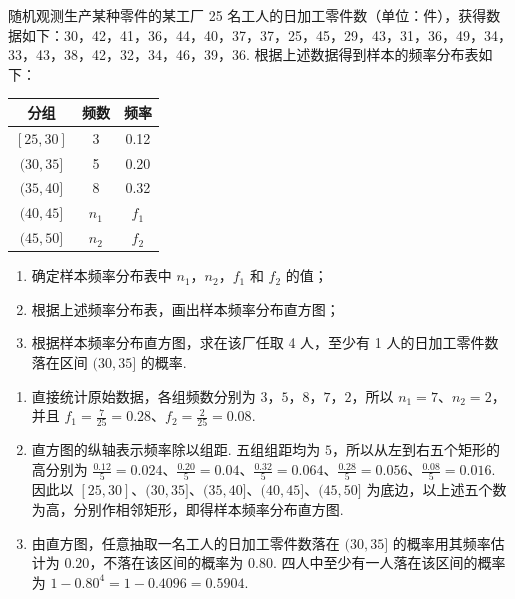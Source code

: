 \begin{problem}
随机观测生产某种零件的某工厂 25 名工人的日加工零件数（单位：件），获得数据如下：30，42，41，36，44，40，37，37，25，45，29，43，31，36，49，34，33，43，38，42，32，34，46，39，36.
根据上述数据得到样本的频率分布表如下：

\begin{center}
\begin{tabular}{c|cc}
\hline
分组 & 频数 & 频率 \\
\hline
\([25,30]\) & 3 & 0.12 \\
\((30,35]\) & 5 & 0.20 \\
\((35,40]\) & 8 & 0.32 \\
\((40,45]\) & \(n_1\) & \(f_1\) \\
\((45,50]\) & \(n_2\) & \(f_2\) \\
\hline
\end{tabular}
\end{center}

\begin{enumerate}
\item 确定样本频率分布表中 \(n_1\)，\(n_2\)，\(f_1\) 和 \(f_2\) 的值；
\item 根据上述频率分布表，画出样本频率分布直方图；
\item 根据样本频率分布直方图，求在该厂任取 4 人，至少有 1 人的日加工零件数落在区间 \((30,35]\) 的概率.
\end{enumerate}
\end{problem}

\begin{solution}
\begin{enumerate}
\item 直接统计原始数据，各组频数分别为 \(3\)，\(5\)，\(8\)，\(7\)，\(2\)，所以
\(n_1=7\)、\(n_2=2\)，并且
\(f_1=\frac{7}{25}=0.28\)、\(f_2=\frac{2}{25}=0.08\).

 \item 直方图的纵轴表示频率除以组距. 五组组距均为 \(5\)，所以从左到右五个矩形的高分别为
\(\frac{0.12}{5}=0.024\)、\(\frac{0.20}{5}=0.04\)、\(\frac{0.32}{5}=0.064\)、\(\frac{0.28}{5}=0.056\)、\(\frac{0.08}{5}=0.016\).
因此以 \([25,30]\)、\((30,35]\)、\((35,40]\)、\((40,45]\)、\((45,50]\) 为底边，以上述五个数为高，分别作相邻矩形，即得样本频率分布直方图.

 \item 由直方图，任意抽取一名工人的日加工零件数落在 \((30,35]\) 的概率用其频率估计为 \(0.20\)，不落在该区间的概率为 \(0.80\). 四人中至少有一人落在该区间的概率为
\(1-0.80^4=1-0.4096=0.5904\).
\end{enumerate}
\end{solution}

